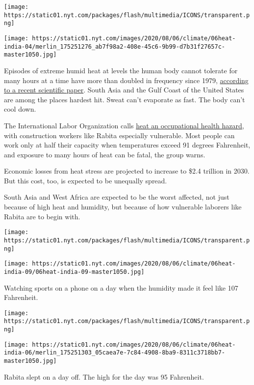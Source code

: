 \texttt{[image: https://static01.nyt.com/packages/flash/multimedia/ICONS/transparent.png]}

\texttt{[image: https://static01.nyt.com/images/2020/08/06/climate/06heat-india-04/merlin\_175251276\_ab7f98a2-408e-45c6-9b99-d7b31f27657c-master1050.jpg]}

Episodes of extreme humid heat at levels the human body cannot tolerate
for many hours at a time have more than doubled in frequency since 1979,
\href{https://blogs.ei.columbia.edu/2020/05/08/fatal-heat-humidity-emerging/?shareadraft=baba77757_5e8c736da48a5}{according
to a recent scientific paper}. South Asia and the Gulf Coast of the
United States are among the places hardest hit. Sweat can't evaporate as
fast. The body can't cool down.

The International Labor Organization calls
\href{https://www.ilo.org/wcmsp5/groups/public/---dgreports/---dcomm/---publ/documents/publication/wcms_711919.pdf}{}
\href{https://www.ilo.org/wcmsp5/groups/public/---dgreports/---dcomm/---publ/documents/publication/wcms_711919.pdf}{heat
an occupational health hazard}, with construction workers like Rabita
especially vulnerable. Most people can work only at half their capacity
when temperatures exceed 91 degrees Fahrenheit, and exposure to many
hours of heat can be fatal, the group warns.

Economic losses from heat stress are projected to increase to \$2.4
trillion in 2030. But this cost, too, is expected to be unequally
spread.

South Asia and West Africa are expected to be the worst affected, not
just because of high heat and humidity, but because of how vulnerable
laborers like Rabita are to begin with.

\texttt{[image: https://static01.nyt.com/packages/flash/multimedia/ICONS/transparent.png]}

\texttt{[image: https://static01.nyt.com/images/2020/08/06/climate/06heat-india-09/06heat-india-09-master1050.jpg]}

Watching sports on a phone on a day when the humidity made it feel like
107 Fahrenheit.

\texttt{[image: https://static01.nyt.com/packages/flash/multimedia/ICONS/transparent.png]}

\texttt{[image: https://static01.nyt.com/images/2020/08/06/climate/06heat-india-06/merlin\_175251303\_05caea7e-7c84-4908-8ba9-8311c3718bb7-master1050.jpg]}

Rabita slept on a day off. The high for the day was 95 Fahrenheit.

